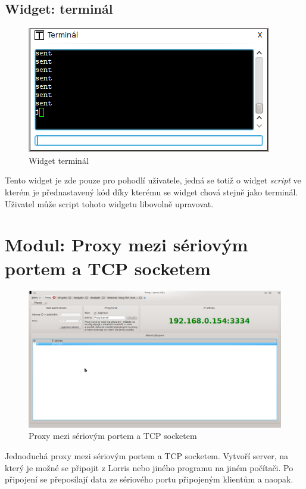 \documentclass[12pt, a4paper, oneside]{article}
\newcommand{\It}{\textit}  %
\begin{document}
\subsection{Widget: terminál}
\begin{figure}[H]
\begin{center}
\includegraphics[scale=0.70]{img/w_terminal.png}
\caption{Widget terminál}
\end{center}
\end{figure}
Tento widget je zde pouze pro pohodlí uživatele, jedná se totiž o widget \It{script} ve kterém je přednastavený kód díky kterému se widget chová stejně jako terminál. Uživatel může script tohoto widgetu libovolně upravovat.

\newpage
\setlength{\voffset}{0mm} %
\pagestyle{plain}
\section{Modul: Proxy mezi sériovým portem a TCP socketem}
\begin{figure}[H]
\begin{center}
\includegraphics[width=\textwidth]{img/proxy.png}
\caption{Proxy mezi sériovým portem a TCP socketem}
\label{Shupito}
\end{center}
\end{figure}
Jednoduchá proxy mezi sériovým portem a TCP socketem. Vytvoří server, na který je možné se připojit z Lorris nebo jiného programu na jiném počítači. Po připojení se přeposílají data ze sériového portu připojeným klientům a naopak.
\end{document}
